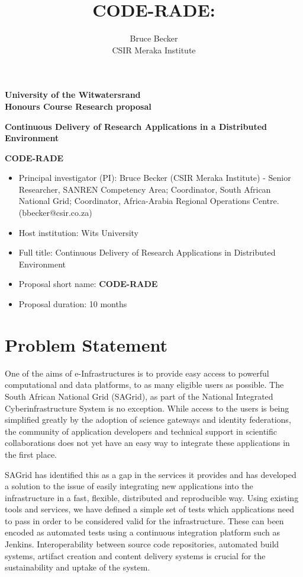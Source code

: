 \documentclass[oneside, a4paper, onecolumn, 11pt]{article}
\title{CODE-RADE:\\ }
\author{Bruce Becker\\ CSIR Meraka Institute}
\begin{document}
\vfill

\begin{center}
\large{\textbf{University of the Witwatersrand \\
Honours Course Research proposal }
}
\vfill

\LARGE{\textbf{Continuous Delivery of Research Applications in a Distributed Environment }}

\vfill

\LARGE{\textbf{CODE-RADE}}

\vfill

\end{center}

\vfill

\begin{itemize}
\item Principal investigator (PI): Bruce Becker (CSIR Meraka Institute) - Senior Researcher, SANREN Competency Area; Coordinator, South African National Grid; Coordinator, Africa-Arabia Regional Operations Centre. (bbecker@csir.co.za)
\item Host institution: Wits University
\item Full title: Continuous Delivery of Research Applications in Distributed Environment
\item Proposal short name: \bf{CODE-RADE}
\item Proposal duration: 10 months
\end{itemize}


\vfill

\noindent
\section{Problem Statement}
One of the aims of e-Infrastructures is to provide easy access to powerful computational and data platforms, to as many eligible users as possible. The South African National Grid (SAGrid), as part of the National Integrated Cyberinfrastructure System is no exception. While access to the users is being simplified greatly by the adoption of science gateways and identity federations, the community of application developers and technical support in scientific collaborations does not yet have an easy way to integrate these applications in the first place.

SAGrid has identified this as a gap in the services it provides and has developed a solution to the issue of easily integrating new applications into the infrastructure in a fast, flexible, distributed and reproducible way. Using existing tools and services, we have defined a simple set of tests which applications need to pass in order to be considered valid for the infrastructure. These can been encoded as automated tests using a continuous integration platform such as Jenkins. Interoperability between source code repositories, automated build systems, artifact creation and content delivery systems is crucial for the sustainability and uptake of the system.
\end{document}
